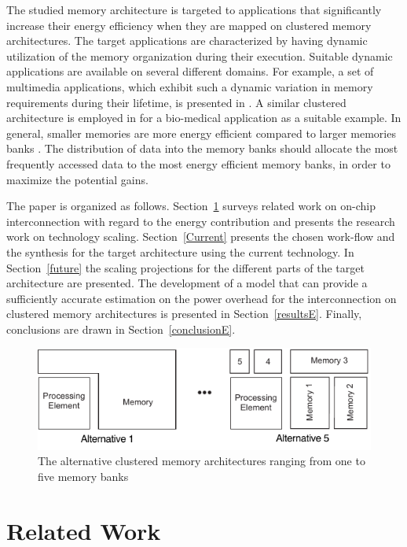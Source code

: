    The studied memory architecture is targeted to applications that significantly increase their energy efficiency when they are mapped on clustered memory architectures.
  The target applications are characterized by having dynamic utilization of the memory organization during their execution. 
 Suitable dynamic applications are available on several different domains.
 For example, a set of multimedia applications, which exhibit such a dynamic variation in memory requirements during their lifetime, is presented in \cite{filippopoulos2013exploration}.
 A similar clustered architecture is employed in \cite{Fil12} for a bio-medical application as a suitable example.
 In general, smaller memories are more energy efficient compared to larger memories banks \cite{steinke2002assigning}. 
 The distribution of data into the memory banks should allocate the most frequently accessed data to the most energy efficient memory banks, in order to maximize the potential gains.
 
The paper is organized as follows.
Section~\ref{relatedE} surveys related work on on-chip interconnection with regard to the energy contribution and presents the research work on technology scaling. 
Section~\ref{Current} presents the chosen work-flow and the synthesis for the target architecture using the current technology.
In Section~\ref{future} the scaling projections for the different parts of the target architecture are presented.
The development of a model that can provide a sufficiently accurate estimation on the power overhead for the interconnection on clustered memory architectures is presented in Section~\ref{resultsE}.
Finally, conclusions are drawn in Section~\ref{conclusionE}.

\begin{figure}
 \centering
 \includegraphics[width = \textwidth]{E/platform.pdf}
  \caption{The alternative clustered memory architectures ranging from one to five memory banks}
 \label{fig:platformE}
 \end{figure}

\section{Related Work}
\label{relatedE}

